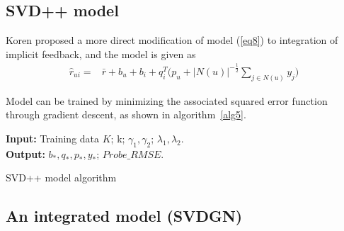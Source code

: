 \documentclass[journal]{IEEEtran}
\begin{document}
\subsection{SVD++ model}
Koren \cite{koren} proposed a more direct modification of model (\ref{eq8}) to integration of implicit feedback, and the model is given as
\begin{align}
\label{eq11}
\hat{r}_{ui} = & \bar{r} + b_u + b_i +  q_i^T\Big(p_u +  |N(u)|^{-\frac{1}{2}} \sum_{j \in N(u)}  y_{j} \Big)
\end{align}

Model can be trained by minimizing the associated squared error function through gradient descent, as shown in algorithm~\ref{alg5}.

\begin{algorithm}[ht]
 \SetAlgoLined  %
 \textbf{Input:} {Training data $K$; k; $\gamma_1, \gamma_2$; $\lambda_1, \lambda_2$.} \\
 \textbf{Output:} {$b_*, q_*, p_*, y_*$; $Probe\_RMSE$.} \\

 \caption{SVD++ model algorithm}
\label{alg5}
\end{algorithm}


\subsection{An integrated model (SVDGN)}
\end{document}
